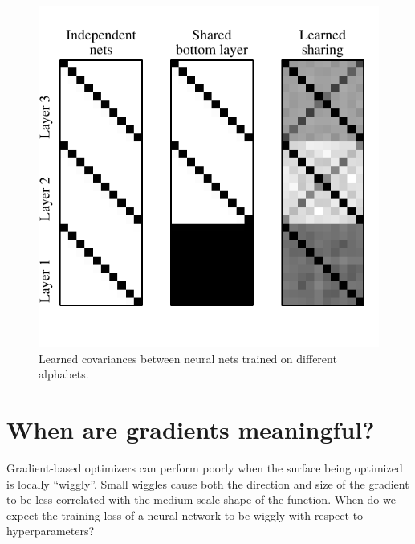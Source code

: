 \documentclass{article}
\begin{document}
\begin{figure}[h!]
\begin{center}
\includegraphics[width=\columnwidth]{../experiments/Feb_4_augmented_omniglot/1/learned_corr.pdf}
\caption{Learned covariances between neural nets trained on different alphabets.}
\label{fig:omniglot}
\end{center}
\end{figure} 



\section{When are gradients meaningful?}

Gradient-based optimizers can perform poorly when the surface being optimized is locally ``wiggly''.
Small wiggles cause both the direction and size of the gradient to be less correlated with the medium-scale shape of the function.
When do we expect the training loss of a neural network to be wiggly with respect to hyperparameters?
\end{document}
